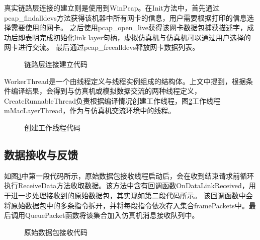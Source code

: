 \par
真实链路层连接的建立则是使用到WinPcap。在Init方法中，首先通过pcap\_findalldevs方法获得该机器中所有网卡的信息，用户需要根据打印的信息选择需要使用的网卡。
之后使用pcap\_open\_live获得该网卡数据包捕获描述字，成功后即表明完成初始化link layer句柄，虚拟仿真机与仿真机可以通过用户选择的网卡进行交流。
最后通过pcap\_freealldevs释放网卡数据列表。
\clearpage
\begin{figure}[h!]
    \centering
     
    \caption{链路层连接建立代码}
    \label{code2}
\end{figure}

\par
WorkerThread是一个由线程定义与线程实例组成的结构体。上文中提到，根据条件编译结果，会得到与仿真机或模拟数据交流的两种线程定义，
CreateRunnableThread负责根据编译情况创建工作线程，图\ref{code3}工作线程mMacLayerThread，作为与仿真机交流环境中的线程。
\begin{figure}[h!]
    \centering
     
    \caption{创建工作线程代码}
    \label{code3}
\end{figure}

\subsection{数据接收与反馈}
如图\ref{code4}中第一段代码所示，原始数据包接收线程启动后，会在收到结束请求前循环执行ReceiveData方法收取数据。该方法中含有回调函数OnDataLinkReceived，用于进一步处理接收到的原始数据包，其实现如第二段代码所示。
该回调函数中会将原始数据包中的多条指令拆开，并将每段指令依次存入集合framePackets中。最后调用QueuePacket函数将该集合加入仿真机消息接收队列中。
\begin{figure}[h!]
    \centering
     
    \caption{原始数据包接收代码}
    \label{code4}
\end{figure}

